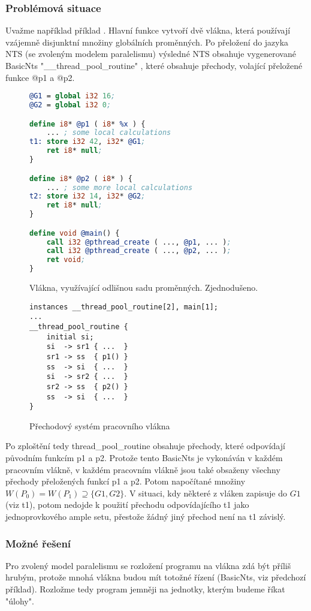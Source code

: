 \documentclass[10pt,a4paper,notitlepage]{report}
\begin{document}
\subsubsection{Problémová situace}
Uvažme například příklad . Hlavní funkce vytvoří dvě vlákna, která používají vzájemně disjunktní množiny globálních proměnných. Po přeložení do jazyka NTS (se zvoleným modelem paralelismu) výsledné NTS obsahuje vygenerované BasicNts "__thread_pool_routine" , které obsahuje přechody, volající přeložené funkce @p1 a @p2.
\begin{figure}[h!]
\begin{lstlisting}[language=llvm]
@G1 = global i32 16;
@G2 = global i32 0;

define i8* @p1 ( i8* %x ) {
	... ; some local calculations
t1:	store i32 42, i32* @G1;
	ret i8* null;
}

define i8* @p2 ( i8* ) {
	... ; some more local calculations
t2:	store i32 14, i32* @G2;
	ret i8* null;
}

define void @main() {
	call i32 @pthread_create ( ..., @p1, ... );
	call i32 @pthread_create ( ..., @p2, ... );
	ret void;
}
\end{lstlisting}
\caption{Vlákna, využívající odlišnou sadu proměnných. Zjednodušeno.}
\end{figure}

\begin{figure}
\begin{lstlisting}
instances __thread_pool_routine[2], main[1];
...
__thread_pool_routine {
	initial	si;
	si  -> sr1 { ...  }
	sr1 -> ss  { p1() }
	ss  -> si  { ...  }
	si  -> sr2 { ...  }
	sr2 -> ss  { p2() }
	ss  -> si  { ...  }
}
\end{lstlisting}
\caption{Přechodový systém pracovního vlákna}
\end{figure}

Po zploštění tedy thread\_pool\_routine obsahuje přechody, které odpovídají původním funkcím p1 a p2. Protože tento BasicNts je vykonáván v každém pracovním vlákně, v každém pracovním vlákně jsou také obsaženy všechny přechody přeložených funkcí p1 a p2. Potom napočítané množiny $W(P_0) = W(P_1) \supseteq \{ G1, G2\}$. V situaci, kdy některé z vláken zapisuje do $G1$ (viz t1), potom nedojde k použití přechodu odpovídajícího t1 jako jednoprovkového ample setu, přestože žádný jiný přechod není na t1 závislý. 

\subsubsection{Možné řešení}
Pro zvolený model paralelismu se rozložení programu na vlákna zdá být příliš hrubým, protože mnohá vlákna budou mít totožné řízení (BasicNts, viz předchozí příklad). Rozložme tedy program jemněji na jednotky, kterým budeme říkat "úlohy".
\end{document}
